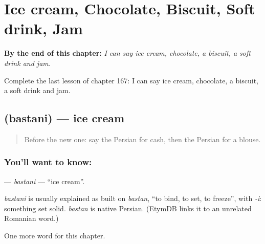 
\chapter{Ice cream, Chocolate, Biscuit, Soft drink, Jam}
\label{ch:fa-ice-cream-chocolate-biscuit-soft-drink-jam}

\begin{chapteropening}
\textbf{By the end of this chapter:} \emph{I can say ice cream, chocolate, a biscuit, a soft drink and jam.}

Complete the last lesson of chapter 167: I can say ice cream, chocolate, a biscuit, a soft drink and jam.
\end{chapteropening}

\section[\texorpdfstring{\fa{بستنی} (bastani)}{بستنی (bastani)}]{ (bastani) — ice cream}

\label{lesson:FA-C167-bastani}



\begin{quote}
Before the new one: say the Persian for cash, then the Persian for a blouse.
\end{quote}

\subsection*{You'll want to know: }
\textbf{} — \emph{bastani} — \textquotedblleft{}ice cream\textquotedblright{}.

\begin{cousinweb}
\emph{bastani} is usually explained as built on \emph{bastan}, \textquotedblleft{}to bind, to set, to freeze\textquotedblright{}, with \emph{-i}: something set solid. \emph{bastan} is native Persian. (EtymDB links it to an unrelated Romanian word.)
\end{cousinweb}

\begin{grammarlens}[title={What you've built}]
One more word for this chapter.
\end{grammarlens}

